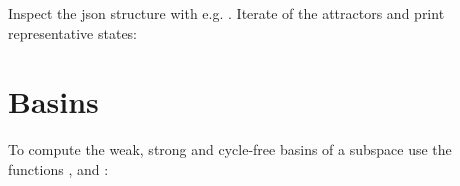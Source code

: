 \documentclass[letterpaper,10pt,english]{sphinxmanual}
\begin{document}
Inspect the json structure with e.g. .
Iterate of the attractors and print representative states:

\begin{sphinxVerbatim}[commandchars=\\\{\}]
\PYG{p}{[}\PYG{p}{]}
   \PYG{p}{[}\PYG{p}{]}
            \PYG{p}{[}\PYG{p}{]}
            \PYG{p}{[}\PYG{p}{]}\PYG{p}{[}\PYG{p}{]}
\end{sphinxVerbatim}


\section{Basins}
\label{\detokenize{ManualQuick:basins}}
To compute the weak, strong and cycle-free basins of a subspace use the functions {\hyperref[\detokenize{Basins:weak-basins}]{}}, {\hyperref[\detokenize{Basins:strong-basin}]{}} and {\hyperref[\detokenize{Basins:cyclefree-basin}]{}}:
\end{document}
